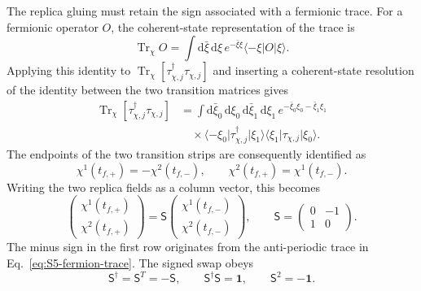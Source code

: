 \documentclass[11pt,a4paper]{article}
\begin{document}
The replica gluing must retain the sign associated with a fermionic trace.
For a fermionic operator \(O\), the coherent-state representation of the
trace is
\begin{equation}
  \operatorname{Tr}_{\chi}O
  =
  \int
  \mathrm d\bar\xi\,\mathrm d\xi\,
  e^{-\bar\xi\xi}
  \langle-\xi\vert O\vert\xi\rangle .
\label{eq:S5-fermion-trace}
\end{equation}
Applying this identity to
\(\operatorname{Tr}_{\chi}
[\tau_{\chi,j}^{\dagger}\tau_{\chi,j}]\)
and inserting a coherent-state resolution of the identity between the two
transition matrices gives
\begin{equation}
\begin{aligned}
  \operatorname{Tr}_{\chi}
  \left[
  \tau_{\chi,j}^{\dagger}\tau_{\chi,j}
  \right]
  &=
  \int
  \mathrm d\bar\xi_0\,\mathrm d\xi_0\,
  \mathrm d\bar\xi_1\,\mathrm d\xi_1\,
  e^{-\bar\xi_0\xi_0-\bar\xi_1\xi_1}
  \\
  &\quad\times
  \langle-\xi_0\vert
  \tau_{\chi,j}^{\dagger}
  \vert\xi_1\rangle
  \langle\xi_1\vert
  \tau_{\chi,j}
  \vert\xi_0\rangle .
\end{aligned}
\label{eq:S5-transition-coherent-trace}
\end{equation}
The endpoints of the two transition strips are consequently identified as
\begin{equation}
  \chi^1(t_{f,+})
  =
  -\chi^2(t_{f,-}),
  \qquad
  \chi^2(t_{f,+})
  =
  \chi^1(t_{f,-}).
\label{eq:S5-chi-endpoint-gluing}
\end{equation}
Writing the two replica fields as a column vector, this becomes
\begin{equation}
  \begin{pmatrix}
    \chi^1(t_{f,+})\\
    \chi^2(t_{f,+})
  \end{pmatrix}
  =
  \mathsf S
  \begin{pmatrix}
    \chi^1(t_{f,-})\\
    \chi^2(t_{f,-})
  \end{pmatrix},
  \qquad
  \mathsf S
  =
  \begin{pmatrix}
    0&-1\\
    1&0
  \end{pmatrix}.
\label{eq:S5-signed-swap}
\end{equation}
The minus sign in the first row originates from the anti-periodic trace in
Eq.~\eqref{eq:S5-fermion-trace}. The signed swap obeys
\begin{equation}
  \mathsf S^\dagger
  =
  \mathsf S^T
  =
  -\mathsf S,
  \qquad
  \mathsf S^\dagger\mathsf S
  =
  \mathbf 1,
  \qquad
  \mathsf S^2
  =
  -\mathbf 1 .
\label{eq:S5-signed-swap-properties}
\end{equation}
\end{document}
